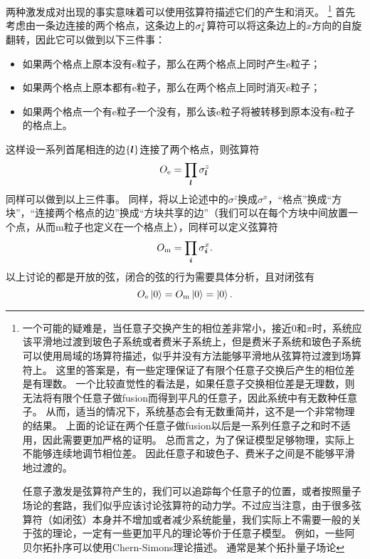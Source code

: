 两种激发成对出现的事实意味着可以使用弦算符描述它们的产生和消灭。%
\footnote{
    一个可能的疑难是，当任意子交换产生的相位差非常小，接近$0$和$\pi$时，系统应该平滑地过渡到玻色子系统或者费米子系统上，但是费米子系统和玻色子系统可以使用局域的场算符描述，似乎并没有方法能够平滑地从弦算符过渡到场算符上。
    这里的答案是，有一些定理保证了有限个任意子交换后产生的相位差是有理数。
    一个比较直觉性的看法是，如果任意子交换相位差是无理数，则无法将有限个任意子做fusion而得到平凡的任意子，因此系统中有无数种任意子。
    从而，适当的情况下，系统基态会有无数重简并，这不是一个非常物理的结果。
    上面的论证在两个任意子做fusion以后是一系列任意子之和时不适用，因此需要更加严格的证明。
    总而言之，为了保证模型足够物理，实际上不能够连续地调节相位差。
    因此任意子和玻色子、费米子之间是不能够平滑地过渡的。

    任意子激发是弦算符产生的，我们可以追踪每个任意子的位置，或者按照量子场论的套路，我们似乎应该讨论弦算符的动力学。不过应当注意，由于很多弦算符（如闭弦）本身并不增加或者减少系统能量，我们实际上不需要一般的关于弦的理论，一定有一些更加平凡的理论等价于任意子模型。
    例如，一些阿贝尔拓扑序可以使用Chern-Simons理论描述。
    通常是某个拓扑量子场论
}%
首先考虑由一条边连接的两个格点，这条边上的${\sigma}^z_{\vb*{i}}$算符可以将这条边上的$x$方向的自旋翻转，因此它可以做到以下三件事：
\begin{itemize}
    \item 如果两个格点上原本没有e粒子，那么在两个格点上同时产生e粒子；
    \item 如果两个格点上原本都有e粒子，那么在两个格点上同时消灭e粒子； 
    \item 如果两个格点一个有e粒子一个没有，那么该e粒子将被转移到原本没有e粒子的格点上。
\end{itemize}
这样设一系列首尾相连的边$\{\vb*{l}\}$连接了两个格点，则弦算符
\begin{equation}
    {O}_\text{e} = \prod_{\vb*{l}} {\sigma}_{\vb*{l}}^z
\end{equation}
同样可以做到以上三件事。
同样，将以上论述中的${\sigma}^z$换成${\sigma}^x$，“格点”换成“方块”，“连接两个格点的边”换成“方块共享的边”（我们可以在每个方块中间放置一个点，从而m粒子也定义在一个格点上），同样可以定义弦算符
\begin{equation}
    {O}_\text{m} = \prod_{\vb*{i}} {\sigma}_{\vb*{i}}^x.
\end{equation}
以上讨论的都是开放的弦，闭合的弦的行为需要具体分析，且对闭弦有
\begin{equation}
    {O}_\text{e} \ket{0} = {O}_\text{m} \ket{0} = \ket{0}.
\end{equation}


